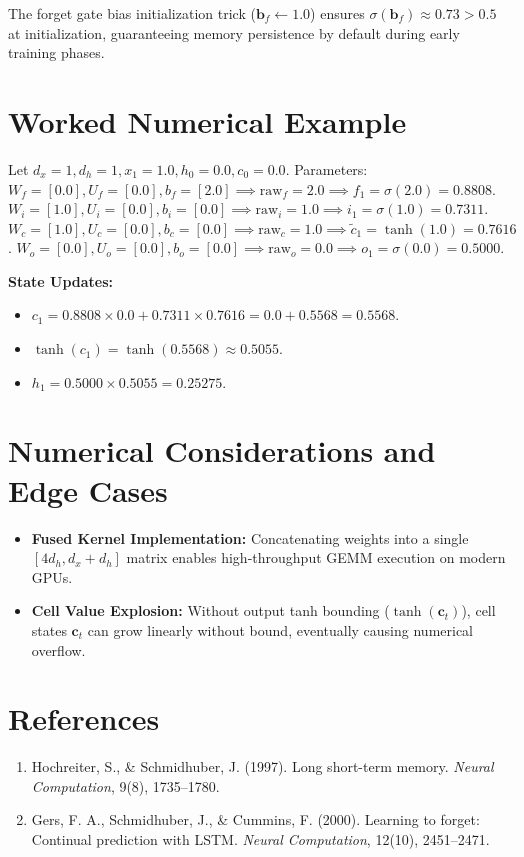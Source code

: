 \documentclass[11pt,a4paper]{article}
\theoremstyle{definition}
\begin{document}
The forget gate bias initialization trick ($\mathbf{b}_f \gets 1.0$) ensures $\sigma(\mathbf{b}_f) \approx 0.73 > 0.5$ at initialization, guaranteeing memory persistence by default during early training phases.

\section{Worked Numerical Example}

Let $d_x = 1, d_h = 1, x_1 = 1.0, h_0 = 0.0, c_0 = 0.0$.
Parameters:
$W_f = [0.0], U_f = [0.0], b_f = [2.0] \implies \text{raw}_f = 2.0 \implies f_1 = \sigma(2.0) = 0.8808$.
$W_i = [1.0], U_i = [0.0], b_i = [0.0] \implies \text{raw}_i = 1.0 \implies i_1 = \sigma(1.0) = 0.7311$.
$W_c = [1.0], U_c = [0.0], b_c = [0.0] \implies \text{raw}_c = 1.0 \implies \tilde{c}_1 = \tanh(1.0) = 0.7616$.
$W_o = [0.0], U_o = [0.0], b_o = [0.0] \implies \text{raw}_o = 0.0 \implies o_1 = \sigma(0.0) = 0.5000$.

\textbf{State Updates:}
\begin{itemize}
    \item $c_1 = 0.8808 \times 0.0 + 0.7311 \times 0.7616 = 0.0 + 0.5568 = 0.5568$.
    \item $\tanh(c_1) = \tanh(0.5568) \approx 0.5055$.
    \item $h_1 = 0.5000 \times 0.5055 = 0.25275$.
\end{itemize}

\section{Numerical Considerations and Edge Cases}

\begin{itemize}
    \item \textbf{Fused Kernel Implementation:} Concatenating weights into a single $[4d_h, d_x + d_h]$ matrix enables high-throughput GEMM execution on modern GPUs.
    \item \textbf{Cell Value Explosion:} Without output tanh bounding ($\tanh(\mathbf{c}_t)$), cell states $\mathbf{c}_t$ can grow linearly without bound, eventually causing numerical overflow.
\end{itemize}

\section{References}
\begin{enumerate}
    \item Hochreiter, S., \& Schmidhuber, J. (1997). Long short-term memory. \emph{Neural Computation}, 9(8), 1735--1780.
    \item Gers, F. A., Schmidhuber, J., \& Cummins, F. (2000). Learning to forget: Continual prediction with LSTM. \emph{Neural Computation}, 12(10), 2451--2471.
\end{enumerate}
\end{document}
